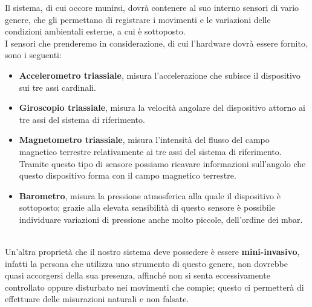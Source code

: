 \documentclass[a4paper, oneside]{book}
\begin{document}
Il sistema, di cui occore munirsi, dovrà contenere al suo interno sensori di vario genere, che gli permettano di registrare i movimenti e le variazioni delle condizioni ambientali esterne, a cui è sottoposto. \\
I sensori che prenderemo in considerazione, di cui l'hardware dovrà essere fornito, sono i seguenti:
\begin{itemize}
\item \textbf{Accelerometro triassiale}, misura l’accelerazione che subisce il dispositivo sui tre assi cardinali.
\item \textbf{Giroscopio triassiale}, misura la velocità angolare del dispositivo attorno ai tre assi del sistema di riferimento.
\item \textbf{Magnetometro triassiale}, misura l’intensità del flusso del campo magnetico terrestre relativamente ai tre assi del sistema di riferimento. Tramite questo tipo di sensore possiamo ricavare informazioni sull’angolo che questo dispositivo forma con il campo magnetico terrestre.
\item \textbf{Barometro}, misura la pressione atmosferica alla quale il dispositivo è sottoposto; grazie alla elevata sensibilità di questo sensore è possibile individuare variazioni di pressione anche molto piccole, dell’ordine dei mbar.\\ \\
\end{itemize}
Un'altra proprietà che il nostro sistema deve possedere è essere \textbf{mini-invasivo}, infatti la persona che utilizza uno strumento di questo genere, non dovrebbe quasi accorgersi della sua presenza, affinché non si senta eccessivamente controllato oppure disturbato nei movimenti che compie; questo ci permetterà di effettuare delle misurazioni naturali e non falsate.
\end{document}
